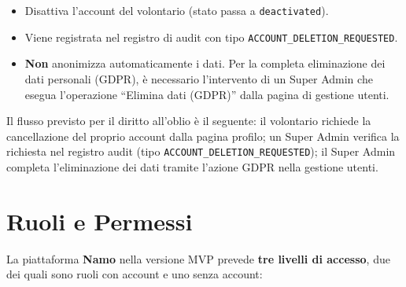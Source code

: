 \documentclass[a4paper,11pt,oneside]{book}
\newcommand{\namo}{\textbf{Namo}}
\begin{document}
\begin{itemize}[leftmargin=1.5em]
  \item Disattiva l'account del volontario (stato passa a \texttt{deactivated}).
  \item Viene registrata nel registro di audit con tipo \texttt{ACCOUNT\_DELETION\_REQUESTED}.
  \item \textbf{Non} anonimizza automaticamente i dati. Per la completa eliminazione dei dati personali (GDPR), \`e necessario l'intervento di un Super Admin che esegua l'operazione ``Elimina dati (GDPR)'' dalla pagina di gestione utenti.
\end{itemize}

\begin{infobox}
Il flusso previsto per il diritto all'oblio \`e il seguente: il volontario richiede la cancellazione del proprio account dalla pagina profilo; un Super Admin verifica la richiesta nel registro audit (tipo \texttt{ACCOUNT\_DELETION\_REQUESTED}); il Super Admin completa l'eliminazione dei dati tramite l'azione GDPR nella gestione utenti.
\end{infobox}

\section{Ruoli e Permessi}
\label{sec:ruoli-permessi}

La piattaforma \namo{} nella versione MVP prevede \textbf{tre livelli di accesso}, due dei quali sono ruoli con account e uno senza account:
\end{document}
